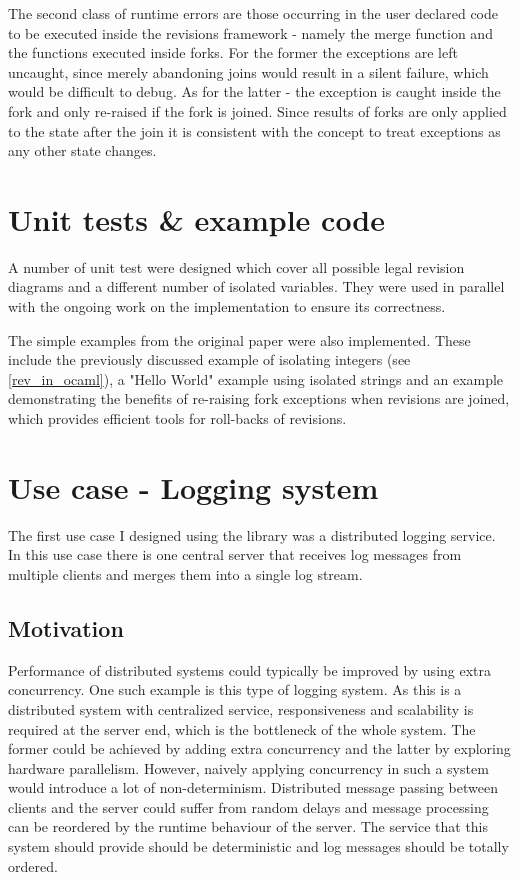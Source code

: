 \documentclass[12pt,twoside,notitlepage]{report}
\begin{document}
{{The second class of runtime errors are those occurring in the user declared code to be executed inside the revisions framework - namely the merge function and the functions executed inside forks. For the former the exceptions are left uncaught, since merely abandoning joins would result in a silent failure, which would be difficult to debug. As for the latter - the exception is caught inside the fork and only re-raised if the fork is joined. Since results of forks are only applied to the state after the join it is consistent with the concept to treat exceptions as any other state changes.  
 
\section{Unit tests \& example code}
 A number of unit test were designed which cover all possible legal revision diagrams and a different number of isolated variables. They were used in parallel with the ongoing work on the implementation to ensure its correctness. 
 
 The simple examples from the original paper were also implemented. These include the previously discussed example of isolating integers (see \ref{rev_in_ocaml}), a "Hello World" example using isolated strings and an example demonstrating the benefits of re-raising fork exceptions when revisions are joined, which provides efficient tools for roll-backs of revisions.
  
\section{Use case - Logging system}
\label{logging} 
The first use case I designed using the library was a distributed logging service. In this use case there is one central server that receives log messages from multiple clients and merges them into a single log stream. 

\subsection{Motivation}
Performance of distributed systems could typically be improved by using extra concurrency. One such example is this type of logging system. 
As this is a distributed system with centralized service, responsiveness and scalability is required at the server end, which is the bottleneck of the whole system. The former could be achieved by adding extra concurrency and the latter by exploring hardware parallelism. However, naively applying concurrency in such a system would introduce a lot of non-determinism. Distributed message passing between clients and the server could suffer from random delays and message processing can be reordered by the runtime behaviour of the server. The service that this system should provide should be deterministic and log messages should be totally ordered.

}}
\end{document}
